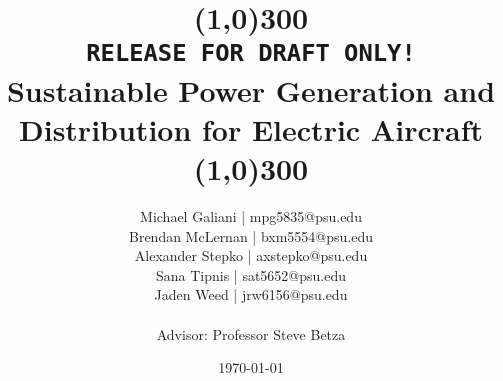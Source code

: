 \documentclass[12pt]{article}
\title{\line(1,0){300}\\\texttt{RELEASE FOR DRAFT ONLY!}\\Sustainable Power Generation and Distribution for Electric Aircraft\\\line(1,0){300}}
\author{
    Michael Galiani | mpg5835@psu.edu\\
    Brendan McLernan | bxm5554@psu.edu\\
    Alexander Stepko | axstepko@psu.edu\\
    Sana Tipnis | sat5652@psu.edu\\
    Jaden Weed | jrw6156@psu.edu\\~\\
    Advisor: Professor Steve Betza
}
\affil{The Pennsylvania State University}
\date{\today}
\begin{document}
\begin{titlepage}
 \maketitle                   %
\end{titlepage}
\newpage
\raggedright
\parindent15pt



\newpage
\renewcommand\contentsname{Table of Contents} %
\tableofcontents %
\let\tableofcontents\relax

\newpage


\newpage


%

%

\newpage


\clearpage
{}%
\renewcommand*{\thepage}{A-\arabic{page}}

\newpage

\end{document}

